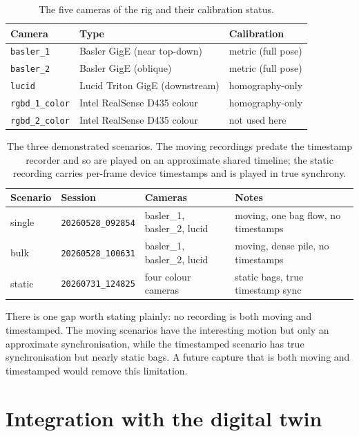 \documentclass[11pt,a4paper]{article}
\newcommand{\code}[1]{\texttt{#1}}
\begin{document}
\begin{table}[H]\centering
\caption{The five cameras of the rig and their calibration status.}
\label{tab:cameras}
\begin{tabular}{lll}
\toprule
Camera & Type & Calibration \\
\midrule
\code{basler\_1}     & Basler GigE (near top-down)   & metric (full pose) \\
\code{basler\_2}     & Basler GigE (oblique)         & metric (full pose) \\
\code{lucid}         & Lucid Triton GigE (downstream)& homography-only \\
\code{rgbd\_1\_color}& Intel RealSense D435 colour   & homography-only \\
\code{rgbd\_2\_color}& Intel RealSense D435 colour   & not used here \\
\bottomrule
\end{tabular}
\end{table}

\begin{table}[H]\centering
\caption{The three demonstrated scenarios. The moving recordings predate the
timestamp recorder and so are played on an approximate shared timeline; the static
recording carries per-frame device timestamps and is played in true synchrony.}
\label{tab:scenarios}
\begin{tabular}{llll}
\toprule
Scenario & Session & Cameras & Notes \\
\midrule
single & \code{20260528\_092854} & basler\_1, basler\_2, lucid & moving, one bag flow, no timestamps \\
bulk   & \code{20260528\_100631} & basler\_1, basler\_2, lucid & moving, dense pile, no timestamps \\
static & \code{20260731\_124825} & four colour cameras         & static bags, true timestamp sync \\
\bottomrule
\end{tabular}
\end{table}

There is one gap worth stating plainly: no recording is both moving and
timestamped. The moving scenarios have the interesting motion but only an
approximate synchronisation, while the timestamped scenario has true
synchronisation but nearly static bags. A future capture that is both moving and
timestamped would remove this limitation.

\section{Integration with the digital twin}
\end{document}
